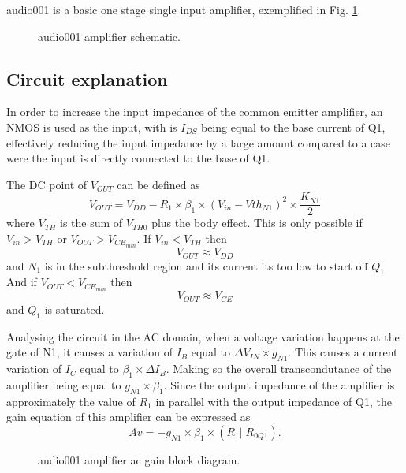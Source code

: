 \documentclass[12pt]{article}
\begin{document}
audio001 is a basic one stage single input amplifier, exemplified in Fig. \ref{audio001}.


\begin{figure}[H]
        \centering
        
        \caption{audio001 amplifier schematic.}
        \label{audio001}
\end{figure}


\subsection{Circuit explanation}

In order to increase the input impedance of the common emitter amplifier, an NMOS is used as the input,  with is $I_{DS}$ being equal to the base current of Q1, effectively reducing the input impedance by a large amount compared to a case were the input is directly connected to the base of Q1.


The DC point of $V_{OUT}$ can be defined as
\[
    V_{OUT} = V_{DD} - R_1 \times \beta_1 \times (V_{in}-Vth_{N1})^2 \times \frac{K_{N1}}{2}
\]
where $V_{TH}$ is the sum of $V_{TH0}$ plus the body effect. This is only possible if $V_{in}>V_{TH}$ or $V_{OUT}>V_{CE_{min}}$.
If $V_{in}<V_{TH}$ then
\[
    V_{OUT} \approx V_{DD}
\]
and $N_1$ is in the subthreshold region and its current its too low to start off $Q_1$
And if $V_{OUT}<V_{CE_{min}}$ then 
\[
    V_{OUT} \approx V_{CE}
\]
and $Q_1$ is saturated.


Analysing the circuit in the AC domain, when a voltage variation happens at the gate of N1, it causes a variation of $I_{B}$ equal to $\Delta V_{IN} \times g_{N1}$.
This causes a current variation of $I_{C}$ equal to $\beta_1 \times \Delta I_{B}$. Making so the overall transcondutance of the amplifier being equal to $g_{N1} \times \beta_1 $. 
Since the output impedance of the amplifier is approximately the value of $R_{1}$ in parallel with the output impedance of Q1, the gain equation of this amplifier can be expressed as
\begin{equation}
    Av = - g_{N1} \times \beta_1 \times (R_1||R_{0Q1}).
\end{equation}

\begin{figure}[H]
        \centering
        
        \caption{audio001 amplifier ac gain block diagram.}
        \label{audio001_dig}
\end{figure}
\end{document}
